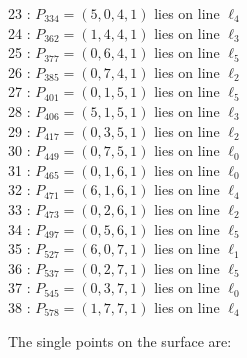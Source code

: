 \documentclass{article}
\begin{document}
{\begin{multicols}{2}
23 : $P_{334}=( 5, 0, 4, 1 )$ lies on line $\ell_{4}$\\
24 : $P_{362}=( 1, 4, 4, 1 )$ lies on line $\ell_{3}$\\
25 : $P_{377}=( 0, 6, 4, 1 )$ lies on line $\ell_{5}$\\
26 : $P_{385}=( 0, 7, 4, 1 )$ lies on line $\ell_{2}$\\
27 : $P_{401}=( 0, 1, 5, 1 )$ lies on line $\ell_{5}$\\
28 : $P_{406}=( 5, 1, 5, 1 )$ lies on line $\ell_{3}$\\
29 : $P_{417}=( 0, 3, 5, 1 )$ lies on line $\ell_{2}$\\
30 : $P_{449}=( 0, 7, 5, 1 )$ lies on line $\ell_{0}$\\
31 : $P_{465}=( 0, 1, 6, 1 )$ lies on line $\ell_{0}$\\
32 : $P_{471}=( 6, 1, 6, 1 )$ lies on line $\ell_{4}$\\
33 : $P_{473}=( 0, 2, 6, 1 )$ lies on line $\ell_{2}$\\
34 : $P_{497}=( 0, 5, 6, 1 )$ lies on line $\ell_{5}$\\
35 : $P_{527}=( 6, 0, 7, 1 )$ lies on line $\ell_{1}$\\
36 : $P_{537}=( 0, 2, 7, 1 )$ lies on line $\ell_{5}$\\
37 : $P_{545}=( 0, 3, 7, 1 )$ lies on line $\ell_{0}$\\
38 : $P_{578}=( 1, 7, 7, 1 )$ lies on line $\ell_{4}$\\
\end{multicols}
The single points on the surface are:\\
}
\end{document}
